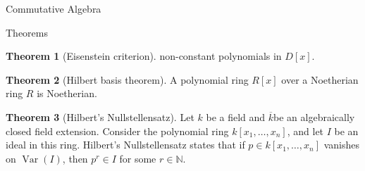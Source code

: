 \documentclass{article}
\theoremstyle{definition}
\newtheorem{theorem}{Theorem}
\numberwithin{theorem}{subsection} %
\theoremstyle{remark}
\theoremstyle{definition}
\newcommand{\Var}{\operatorname{Var}}
\newcommand{\N}{\mathbb N}
\begin{document}
\begin{section}{Commutative Algebra}
\begin{subsection}{Theorems}
\begin{theorem}[Eisenstein criterion]
      non-constant polynomials in $D[x]$.
    \end{theorem}
    \begin{theorem}[Hilbert basis theorem]
      A polynomial ring $R[x]$ over a Noetherian ring $R$ is Noetherian.
    \end{theorem}
    \begin{theorem}[Hilbert's Nullstellensatz]
      Let $k$ be a field and $\overline k$be an algebraically closed field
      extension. Consider the polynomial ring $k[x_1, \hdots, x_n]$, and let
      $I$ be an ideal in this ring.
      Hilbert's Nullstellensatz states that if $p \in k[x_1, \hdots, x_n]$
      vanishes on $\Var(I)$, then $p^r \in I$ for some $r \in \N$.
    \end{theorem}
  \end{subsection}
\end{section}
\pagebreak
\end{document}
